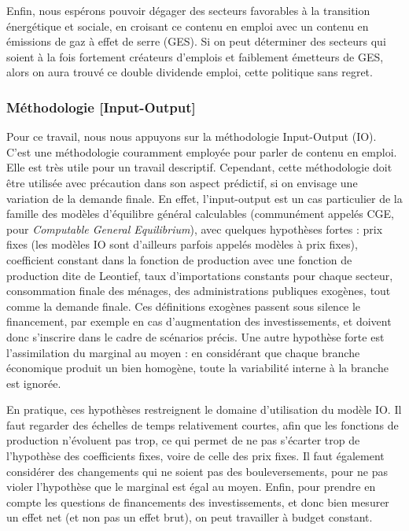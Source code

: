 Enfin, nous espérons pouvoir dégager des secteurs favorables à la transition énergétique et sociale, en croisant ce contenu en emploi avec un contenu en émissions de gaz à effet de serre (GES). Si on peut déterminer des secteurs qui soient à la fois fortement créateurs d’emplois et faiblement émetteurs de GES, alors on aura trouvé ce double dividende emploi, cette politique sans regret. 

\subsubsection{Méthodologie [Input-Output]}
Pour ce travail, nous nous appuyons sur la méthodologie Input-Output (IO). 
C’est une méthodologie couramment employée pour parler de contenu en emploi. Elle est très utile pour un travail descriptif.
Cependant, cette méthodologie doit être utilisée avec précaution dans son aspect prédictif, si on envisage une variation de la demande finale. En effet, l’input-output est un cas particulier de la famille des modèles d'équilibre général calculables (communément appelés CGE, pour \textit{Computable General Equilibrium}), avec quelques hypothèses fortes : prix fixes (les modèles IO sont d’ailleurs parfois appelés modèles à prix fixes), coefficient constant dans la fonction de production avec une fonction de production dite de Leontief, taux d’importations constants pour chaque secteur, consommation finale des ménages, des administrations publiques exogènes, tout comme la demande finale. Ces définitions exogènes passent sous silence le financement, par exemple en cas d’augmentation des investissements, et doivent donc s'inscrire dans le cadre de scénarios précis. Une autre hypothèse forte est l'assimilation du marginal au moyen : en considérant que chaque branche économique produit un bien homogène, toute la variabilité interne à la branche est ignorée.

En pratique, ces hypothèses restreignent le domaine d’utilisation du modèle IO. Il faut regarder des échelles de temps relativement courtes, afin que les fonctions de production n’évoluent pas trop, ce qui permet de ne pas s’écarter trop de l’hypothèse des coefficients fixes, voire de celle des prix fixes. Il faut également considérer des changements qui ne soient pas des bouleversements, pour ne pas violer l’hypothèse que le marginal est égal au moyen.
Enfin, pour prendre en compte les questions de financements des investissements, et donc bien mesurer un effet net (et non pas un effet brut), on peut travailler à budget constant.

